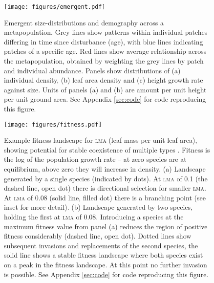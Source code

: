 \documentclass[a4paper,11pt]{article}
\begin{document}
\newpage

\begin{figure}[h!]
\centering
\texttt{[image: figures/emergent.pdf]}
\caption{Emergent size-distributions and demography across a metapopulation.
Grey lines show patterns within individual patches differing in time
since disturbance (age), with blue lines indicating patches of a
specific age. Red lines show average relationship across the metapopulation,
obtained by weighting the grey lines by patch and individual abundance.
Panels show distributions of (a) individual density, (b) leaf area density
and (c) height growth rate against size. Units of panels (a) and
(b) are amount per unit height per unit ground area.
See Appendix \ref{sec:code} for code reproducing this figure.}
\label{fig:emergent}
\end{figure}

\newpage

\begin{figure}[h!]
\centering
\texttt{[image: figures/fitness.pdf]}
\caption{Example fitness landscape for \textsc{lma} (leaf mass per
  unit leaf area), showing potential for stable coexistence of
  multiple types \citep[adapted from][]{Falster-2015}.  Fitness is the log of the population growth rate --
  at zero species are at equilibrium, above zero they will increase in
  density.  (a) Landscape generated by a single species (indicated by
  dots).  At \textsc{lma} of 0.1 (the dashed line, open dot) there is
  directional selection for smaller \textsc{lma}.  At \textsc{lma} of
  0.08 (solid line, filled dot) there is a branching point (see inset
  for more detail).  (b) Landscape generated by two species, holding
  the first at \textsc{lma} of 0.08.  Introducing a species at the
  maximum fitness value from panel (a) reduces the region of positive
  fitness considerably (dashed line, open dot).  Dotted lines show
  subsequent invasions and replacements of the second species, the
  solid line shows a stable fitness landscape where both species exist
  on a peak in the fitness landscape.  At this point no further
  invasion is possible.  See Appendix \ref{sec:code} for code
  reproducing this figure.}
\label{fig:fitness}
\end{figure}

\clearpage
\setcounter{secnumdepth}{1}
\end{document}
